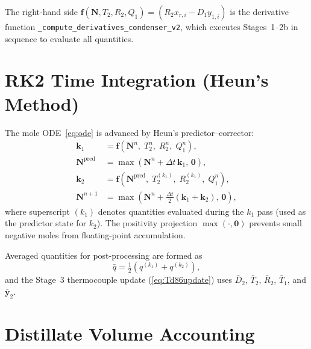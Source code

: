 \documentclass[11pt,letterpaper]{article}
\newcommand{\dt}{\Delta t}
\begin{document}
The right-hand side $\mathbf{f}(\mathbf{N}, T_2, R_2, Q_1) = (R_2 x_{r,i} - D_1 y_{1,i})$
is the derivative function \texttt{\_compute\_derivatives\_condenser\_v2},
which executes Stages~1--2b in sequence to evaluate all quantities.

\section{RK2 Time Integration (Heun's Method)}
\label{sec:rk2}

The mole ODE~\cref{eq:ode} is advanced by Heun's predictor--corrector:
\begin{align}
  \mathbf{k}_1 &= \mathbf{f}\!\left(\mathbf{N}^n,\; T_2^n,\; R_2^n,\; Q_1^n\right),
  \label{eq:k1}\\
  \mathbf{N}^{\mathrm{pred}} &= \max\!\left(\mathbf{N}^n + \dt\,\mathbf{k}_1,\, \mathbf{0}\right),
  \label{eq:pred}\\
  \mathbf{k}_2 &= \mathbf{f}\!\left(\mathbf{N}^{\mathrm{pred}},\; T_2^{(k_1)},\; R_2^{(k_1)},\; Q_1^n\right),
  \label{eq:k2}\\
  \mathbf{N}^{n+1} &= \max\!\left(\mathbf{N}^n + \frac{\dt}{2}(\mathbf{k}_1 + \mathbf{k}_2),\, \mathbf{0}\right),
  \label{eq:corrector}
\end{align}
where superscript $(k_1)$ denotes quantities evaluated during the $k_1$ pass
(used as the predictor state for $k_2$).  The positivity projection
$\max(\cdot, \mathbf{0})$ prevents small negative moles from floating-point
accumulation.

Averaged quantities for post-processing are formed as
\begin{equation}
  \bar{q} = \tfrac{1}{2}(q^{(k_1)} + q^{(k_2)}),
\end{equation}
and the Stage~3 thermocouple update (\cref{eq:Td86update}) uses $\bar{D}_2$,
$\bar{T}_2$, $\bar{R}_2$, $\bar{T}_1$, and $\bar{\mathbf{y}}_2$.

\section{Distillate Volume Accounting}
\label{sec:distvol}
\end{document}
